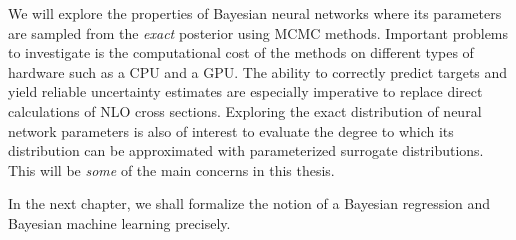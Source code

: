 We will explore the properties of Bayesian neural networks where its parameters are sampled from the \textit{exact} posterior using MCMC methods. Important problems to investigate is the computational cost of the methods on different types of hardware such as a CPU and a GPU. The ability to correctly predict targets and yield reliable uncertainty estimates are especially imperative to replace direct calculations of NLO cross sections. Exploring the exact distribution of neural network parameters is also of interest to evaluate the degree to which its distribution can be approximated with parameterized surrogate distributions.
This will be \textit{some} of the main concerns in this thesis. 

In the next chapter, we shall formalize the notion of a Bayesian regression and Bayesian machine learning precisely.






